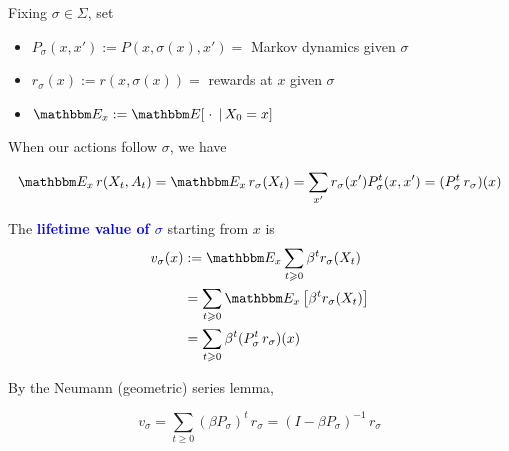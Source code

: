 \documentclass[xcolor=dvipsnames]{beamer}
\renewcommand{\geq}{\geqslant}
\newcommand{\navy}[1]{\textcolor{Blue}{\bf #1}}
\newcommand{\EE}{\mathbbm E}
\renewcommand{\geq}{\geqslant}
\newcommand{\given}{\, | \,}
\newcommand{\1}{\mathbbm 1}
\begin{document}
\begin{frame}

    Fixing $\sigma \in \Sigma$, set
    \begin{itemize}
        \item $P_\sigma(x, x') := P(x, \sigma(x), x') =$ Markov dynamics given
            $\sigma$
        \vspace{0.5em}
        \item $r_\sigma(x) := r(x, \sigma(x)) = $ rewards at $x$ given $\sigma$
        \vspace{0.5em}
        \item $\EE_x := \EE[ \; \cdot \; \given X_0 = x]$
    \end{itemize}

    \vspace{0.5em}
    \vspace{0.5em}
    \vspace{0.5em}
    \vspace{0.5em}
    When our actions follow $\sigma$, we have
    
    \begin{equation*}
        \EE_x  \, r(X_t, A_t) 
         = \EE_x  \, r_\sigma(X_t)  
         = \sum_{x'} r_\sigma(x') P_\sigma^t (x, x')
        = (P_\sigma^t \, r_\sigma) (x)
    \end{equation*}

\end{frame}



\begin{frame}

    
    \vspace{0.5em}
    \vspace{0.5em}
    The \navy{lifetime value of $\sigma$} starting from $x$ is
    \begin{align*}
        v_\sigma (x) 
        & := \EE_x 
            \sum_{t \geq 0} \beta^t r_\sigma(X_t) 
            \\
        & = \sum_{t \geq 0} \EE_x \left[ \beta^t r_\sigma(X_t) \right]
            \\
        & = \sum_{t \geq 0} \beta^t (P_\sigma^t \, r_\sigma)(x)
    \end{align*}


    \vspace{0.5em}
    By the Neumann (geometric) series lemma,

    \begin{equation*}
        v_\sigma 
        = \sum_{t \geq 0} (\beta P_\sigma)^t \, r_\sigma
        = (I - \beta P_\sigma)^{-1} \, r_\sigma 
    \end{equation*}


\end{frame}
\end{document}

